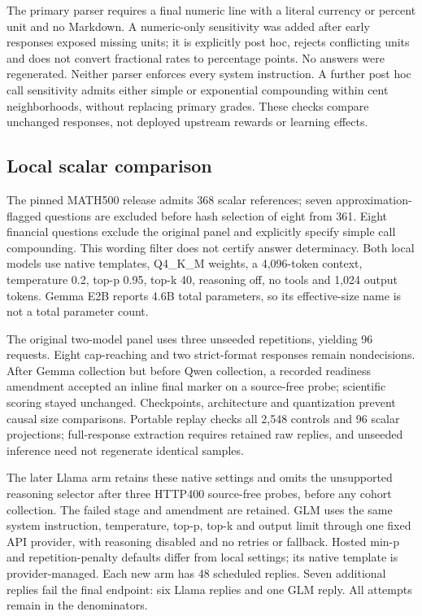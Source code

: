 The primary parser requires a final numeric line with a literal currency or percent unit and no Markdown. A numeric-only sensitivity was added after early responses exposed missing units; it is explicitly post hoc, rejects conflicting units and does not convert fractional rates to percentage points. No answers were regenerated. Neither parser enforces every system instruction. A further post hoc call sensitivity admits either simple or exponential compounding within cent neighborhoods, without replacing primary grades. These checks compare unchanged responses, not deployed upstream rewards or learning effects.

\subsection{Local scalar comparison}\label{app:grader-comparison}
The pinned MATH500 release admits 368 scalar references; seven approximation-flagged questions are excluded before hash selection of eight from 361. Eight financial questions exclude the original panel and explicitly specify simple call compounding. This wording filter does not certify answer determinacy. Both local models use native templates, Q4\_K\_M weights, a 4,096-token context, temperature 0.2, top-p 0.95, top-k 40, reasoning off, no tools and 1,024 output tokens. Gemma E2B reports 4.6B total parameters, so its effective-size name is not a total parameter count.

The original two-model panel uses three unseeded repetitions, yielding 96 requests. Eight cap-reaching and two strict-format responses remain nondecisions. After Gemma collection but before Qwen collection, a recorded readiness amendment accepted an inline final marker on a source-free probe; scientific scoring stayed unchanged. Checkpoints, architecture and quantization prevent causal size comparisons. Portable replay checks all 2,548 controls and 96 scalar projections; full-response extraction requires retained raw replies, and unseeded inference need not regenerate identical samples.

The later Llama arm retains these native settings and omits the unsupported reasoning selector after three HTTP400 source-free probes, before any cohort collection. The failed stage and amendment are retained. GLM uses the same system instruction, temperature, top-p, top-k and output limit through one fixed API provider, with reasoning disabled and no retries or fallback. Hosted min-p and repetition-penalty defaults differ from local settings; its native template is provider-managed. Each new arm has 48 scheduled replies. Seven additional replies fail the final endpoint: six Llama replies and one GLM reply. All attempts remain in the denominators.

